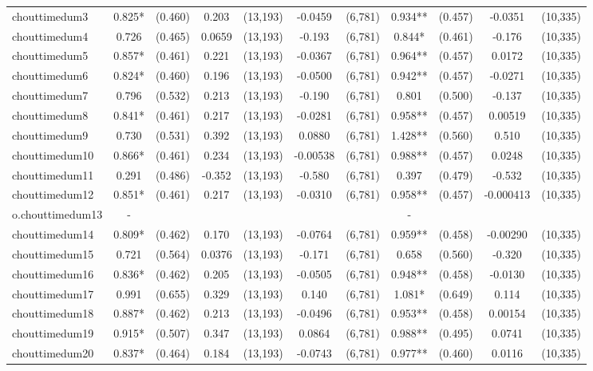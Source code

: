 \documentclass[]{article}
\begin{document}
\begin{tabular}{lcccccccccc}
chouttimedum3 & 0.825* & (0.460) & 0.203 & (13,193) & -0.0459 & (6,781) & 0.934** & (0.457) & -0.0351 & (10,335) \\
chouttimedum4 & 0.726 & (0.465) & 0.0659 & (13,193) & -0.193 & (6,781) & 0.844* & (0.461) & -0.176 & (10,335) \\
chouttimedum5 & 0.857* & (0.461) & 0.221 & (13,193) & -0.0367 & (6,781) & 0.964** & (0.457) & 0.0172 & (10,335) \\
chouttimedum6 & 0.824* & (0.460) & 0.196 & (13,193) & -0.0500 & (6,781) & 0.942** & (0.457) & -0.0271 & (10,335) \\
chouttimedum7 & 0.796 & (0.532) & 0.213 & (13,193) & -0.190 & (6,781) & 0.801 & (0.500) & -0.137 & (10,335) \\
chouttimedum8 & 0.841* & (0.461) & 0.217 & (13,193) & -0.0281 & (6,781) & 0.958** & (0.457) & 0.00519 & (10,335) \\
chouttimedum9 & 0.730 & (0.531) & 0.392 & (13,193) & 0.0880 & (6,781) & 1.428** & (0.560) & 0.510 & (10,335) \\
chouttimedum10 & 0.866* & (0.461) & 0.234 & (13,193) & -0.00538 & (6,781) & 0.988** & (0.457) & 0.0248 & (10,335) \\
chouttimedum11 & 0.291 & (0.486) & -0.352 & (13,193) & -0.580 & (6,781) & 0.397 & (0.479) & -0.532 & (10,335) \\
chouttimedum12 & 0.851* & (0.461) & 0.217 & (13,193) & -0.0310 & (6,781) & 0.958** & (0.457) & -0.000413 & (10,335) \\
o.chouttimedum13 & - &  &  &  &  &  & - &  &  &  \\
chouttimedum14 & 0.809* & (0.462) & 0.170 & (13,193) & -0.0764 & (6,781) & 0.959** & (0.458) & -0.00290 & (10,335) \\
chouttimedum15 & 0.721 & (0.564) & 0.0376 & (13,193) & -0.171 & (6,781) & 0.658 & (0.560) & -0.320 & (10,335) \\
chouttimedum16 & 0.836* & (0.462) & 0.205 & (13,193) & -0.0505 & (6,781) & 0.948** & (0.458) & -0.0130 & (10,335) \\
chouttimedum17 & 0.991 & (0.655) & 0.329 & (13,193) & 0.140 & (6,781) & 1.081* & (0.649) & 0.114 & (10,335) \\
chouttimedum18 & 0.887* & (0.462) & 0.213 & (13,193) & -0.0496 & (6,781) & 0.953** & (0.458) & 0.00154 & (10,335) \\
chouttimedum19 & 0.915* & (0.507) & 0.347 & (13,193) & 0.0864 & (6,781) & 0.988** & (0.495) & 0.0741 & (10,335) \\
chouttimedum20 & 0.837* & (0.464) & 0.184 & (13,193) & -0.0743 & (6,781) & 0.977** & (0.460) & 0.0116 & (10,335) \\

\end{tabular}
\end{document}
